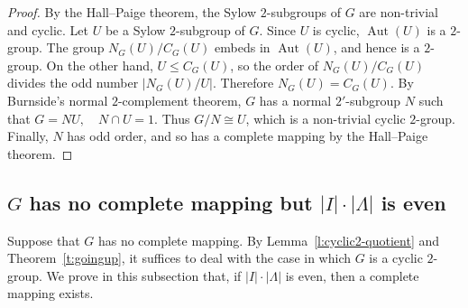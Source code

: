 \documentclass[11pt]{article}
\theoremstyle{plain}
\theoremstyle{remark}
\theoremstyle{definition}
\theoremstyle{plain}
\begin{document}
\begin{proof}
By the Hall--Paige theorem, the Sylow $2$-subgroups of $G$ are non-trivial
and cyclic. Let $U$ be a Sylow $2$-subgroup of $G$. Since $U$ is cyclic,
$\operatorname{Aut}(U)$ is a $2$-group. The group
\(N_G(U)/C_G(U)\)
embeds in $\operatorname{Aut}(U)$, and hence is a $2$-group. On the other
hand, $U\le C_G(U)$, so the order of $N_G(U)/C_G(U)$ divides the odd number
$|N_G(U)/U|$. Therefore $N_G(U)=C_G(U)$. By Burnside's normal
$2$-complement theorem, $G$ has a normal $2'$-subgroup $N$ such that
\(G=NU, \quad N\cap U=1.\)
Thus $G/N\cong U$, which is a non-trivial cyclic $2$-group. Finally, $N$ has
odd order, and so has a complete mapping by the Hall--Paige theorem.
\end{proof}

\subsection[Rees matrix semigroups: even index product]{$G$ has no complete mapping but $|I|\cdot|\Lambda|$ is even}

Suppose that $G$ has no complete mapping. By Lemma~\ref{l:cyclic2-quotient} and Theorem~\ref{t:goingup}, it suffices to deal with the case in which $G$ is a cyclic $2$-group. We prove in this subsection that, if $|I|\cdot|\Lambda|$ is even, then a complete mapping exists.
\end{document}
